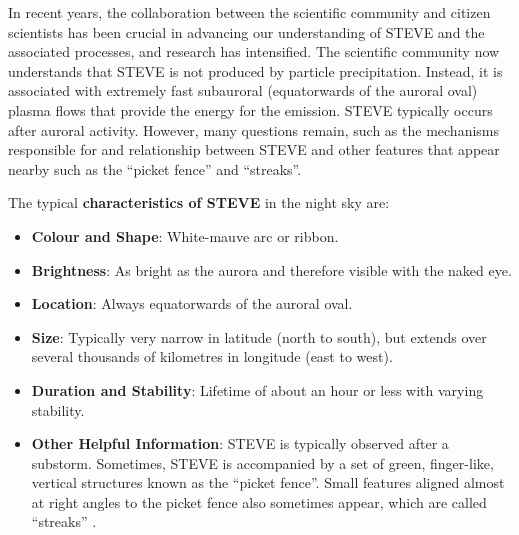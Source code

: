 \documentclass{article}
\renewcommand{\cite}[1]{\parencite{#1}}
\begin{document}
In recent years, the collaboration between the scientific community and citizen scientists has been crucial in advancing our understanding of STEVE and the associated processes, and research has intensified. The scientific community now understands that STEVE is not produced by particle precipitation. Instead, it is associated with extremely fast subauroral (equatorwards of the auroral oval) plasma flows that provide the energy for the emission. STEVE typically occurs after auroral activity. However, many questions remain, such as the mechanisms responsible for and relationship between STEVE and other features that appear nearby such as the ``picket fence'' and ``streaks''.

The typical {\bf characteristics of STEVE} in the night sky are:

\begin{itemize}
\item {\bf Colour and Shape}: White-mauve arc or ribbon. 
\item {\bf Brightness}: As bright as the aurora and therefore visible with the naked eye.
\item {\bf Location}: Always equatorwards of the auroral oval. 
\item {\bf Size}: Typically very narrow in latitude (north to south), but extends over several thousands of kilometres in longitude (east to west).
\item {\bf Duration and Stability}: Lifetime of about an hour or less with varying stability.
\item {\bf Other Helpful Information}: STEVE is typically observed after a substorm. Sometimes, STEVE is accompanied by a set of green, finger-like, vertical structures known as the ``picket fence''. Small features aligned almost at right angles to the picket fence also sometimes appear, which are called ``streaks'' \cite{Semeter2020}.
\end{itemize}
\end{document}
